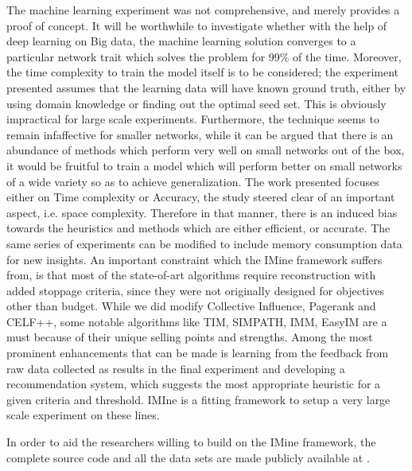 	The machine learning experiment was not comprehensive, and merely provides a proof of concept. It will be worthwhile to investigate whether with the help of deep learning on Big data, the machine learning solution converges to a particular network trait which solves the problem for 99\% of the time. Moreover, the time complexity to train the model itself is to be considered; the experiment presented assumes that the learning data will have known ground truth, either by using domain knowledge or finding out the optimal seed set. This is obviously impractical for large scale experiments. Furthermore, the technique seems to remain infaffective for smaller networks, while it can be argued that there is an abundance of methods which perform very well on small networks out of the box, it would be fruitful to train a model which will perform better on small networks of a wide variety so as to achieve generalization. The work presented focuses either on Time complexity or Accuracy, the study steered clear of an important aspect, i.e. space complexity. Therefore in that manner, there is an induced bias towards the heuristics and methods which are either efficient, or accurate. The same series of experiments can be modified to include memory consumption data for new insights. An important constraint which the IMine framework suffers from, is that most of the state-of-art algorithms require reconstruction with added stoppage criteria, since they were not originally designed for objectives other than budget. While we did modify Collective Influence, Pagerank and CELF++, some notable algorithms like TIM, SIMPATH, IMM, EasyIM are a must because of their unique selling points and strengths. Among the most prominent enhancements that can be made is learning from the feedback from raw data collected as results in the final experiment and developing a recommendation system, which suggests the most appropriate heuristic for a given criteria and threshold. IMIne is a fitting framework to setup a very large scale experiment on these lines.
	
	In order to aid the researchers willing to build on the IMine framework, the complete source code and all the data sets are made publicly available at \cite{hussain2020}.
